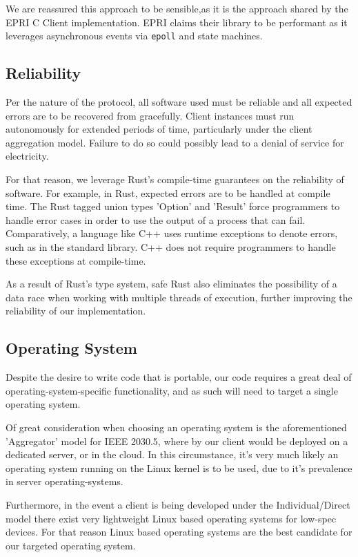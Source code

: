 We are reassured this approach to be sensible,as it is the approach shared by the EPRI C Client implementation. EPRI claims their library to be performant as it leverages asynchronous events via \texttt{epoll} and state machines.


\subsection{Reliability}
Per the nature of the protocol, all software used must be reliable and all expected errors are to be recovered from gracefully. Client instances must run autonomously for extended periods of time, particularly under the client aggregation model. Failure to do so could possibly lead to a denial of service for electricity.

For that reason, we leverage Rust's compile-time guarantees on the reliability of software. For example, in Rust, expected errors are to be handled at compile time. The Rust tagged union types 'Option' and 'Result' force programmers to handle error cases in order to use the output of a process that can fail. Comparatively, a language like C++ uses runtime exceptions to denote errors, such as in the standard library. C++ does not require programmers to handle these exceptions at compile-time.

As a result of Rust's type system, safe Rust also eliminates the possibility of a data race when working with multiple threads of execution, further improving the reliability of our implementation.

\subsection{Operating System}
Despite the desire to write code that is portable, our code requires a great deal of operating-system-specific functionality, and as such will need to target a single operating system. 

Of great consideration when choosing an operating system is the aforementioned 'Aggregator' model for IEEE 2030.5, where by our client would be deployed on a dedicated server, or in the cloud. In this circumstance, it's very much likely an operating system running on the Linux kernel is to be used, due to it's prevalence in server operating-systems.

Furthermore, in the event a client is being developed under the Individual/Direct model there exist very lightweight Linux based operating systems for low-spec devices. For that reason Linux based operating systems are the best candidate for our targeted operating system.

